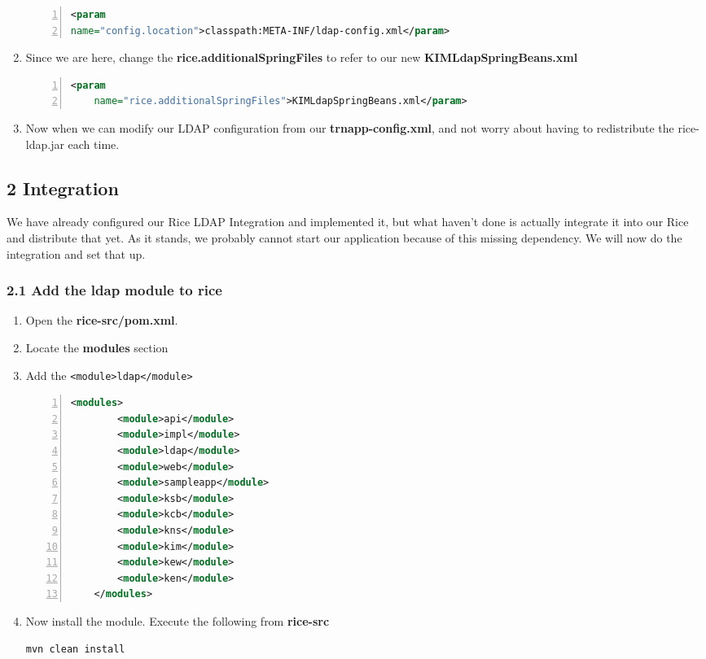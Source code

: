 \begin{enumerate}
\begin{lstlisting}[numbers=left,language=xml,basicstyle=\scriptsize,backgroundcolor=\color{ubergray},caption={trnapp-config.xml},frame=single,breaklines=true]
<param
name="config.location">classpath:META-INF/ldap-config.xml</param>
\end{lstlisting}
\item Since we are here, change the
  \textbf{rice.additionalSpringFiles} to refer to our new \textbf{KIMLdapSpringBeans.xml}

\begin{lstlisting}[numbers=left,language=xml,basicstyle=\scriptsize,backgroundcolor=\color{ubergray},caption={trnapp-config.xml},frame=single,breaklines=true]
   	<param
    name="rice.additionalSpringFiles">KIMLdapSpringBeans.xml</param>
\end{lstlisting}
\item Now when we can modify our LDAP configuration from our
  \textbf{trnapp-config.xml}, and not worry about having to
  redistribute the rice-ldap.jar each time.
\end{enumerate}

\subsection*{2 Integration}
We have already configured our Rice LDAP Integration and implemented
it, but what haven't done is actually integrate it into our Rice and
distribute that yet. As it stands, we probably cannot start our
application because of this missing dependency. We will now do the
integration and set that up.

\subsubsection*{2.1 Add the ldap module to rice}
\begin{enumerate}
\item Open the \textbf{rice-src/pom.xml}.
\item Locate the \textbf{modules} section
\item Add the \verb|<module>ldap</module>|

\begin{lstlisting}[numbers=left,language=xml,basicstyle=\scriptsize,backgroundcolor=\color{ubergray},caption={rice-src/pom.xml},frame=single,breaklines=true]
	<modules>
		<module>api</module>
		<module>impl</module>
		<module>ldap</module>
		<module>web</module>
		<module>sampleapp</module>
		<module>ksb</module>
		<module>kcb</module>
		<module>kns</module>
		<module>kim</module>
		<module>kew</module>
		<module>ken</module>
	</modules>
\end{lstlisting}
\item Now install the module. Execute the following from
  \textbf{rice-src}
\begin{lstlisting}[language=bash,basicstyle=\scriptsize,backgroundcolor=\color{ubergray},caption={Install
  the LDAP Integration Module},frame=single,breaklines=true]
mvn clean install
\end{lstlisting}
\end{enumerate}

